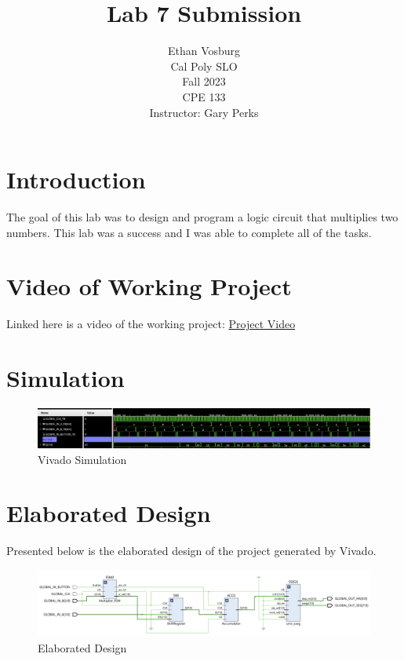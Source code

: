 \documentclass[12pt]{article}
\title{Lab 7 Submission}
\author{Ethan Vosburg\\
    Cal Poly SLO \\
    Fall 2023\\
    CPE 133\\
    Instructor: Gary Perks
}
\begin{document}
\maketitle

\newpage

\section{Introduction}

The goal of this lab was to design and program a logic circuit that multiplies two numbers. This lab was a success and I was able to complete all of the tasks.

\section{Video of Working Project}

Linked here is a video of the working project: \href{https://youtu.be/gVcQAu7Rk40}{Project Video}

\section{Simulation}

\begin{figure}[h]
    \centering
    \includegraphics[width=.95\textwidth]{Figures/CPE 133 Lab 7 Simulation.png}
    \caption{Vivado Simulation}
    \label{fig:simulation}
\end{figure}

\section{Elaborated Design}

Presented below is the elaborated design of the project generated by Vivado.

\begin{figure}[h]
    \centering
    \includegraphics[width=.95\textwidth]{Figures/CPE 133 Lab 7 Elaborated Design.png}
    \caption{Elaborated Design}
    \label{fig:elaborateddesign}
\end{figure}
\end{document}
